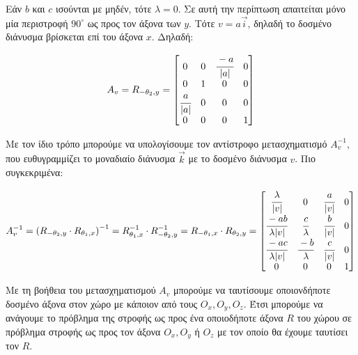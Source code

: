 \begin{solution}
\begin{remark}
	Εάν \(b\) και \(c\) ισούνται με μηδέν, τότε \(\lambda = 0\). Σε αυτή την περίπτωση απαιτείται μόνο μία περιστροφή \(90^\circ\) ως προς τον άξονα των \(y\). Τότε $v= a\vec{i}$, δηλαδή το δοσμένο διάνυσμα βρίσκεται επί του άξονα $x$. Δηλαδή:

	\[
		A_v = R_{-\theta_2, y} =
		\begin{bmatrix}
			0 & 0 & \cfrac{-a}{|a|} & 0 \\
			0 & 1 & 0 & 0 \\
			\cfrac{a}{|a|} & 0 & 0 & 0 \\
			0 & 0 & 0 & 1
		\end{bmatrix}
	\]
\end{remark}


\begin{remark}	
	Με τον ίδιο τρόπο μπορούμε να υπολογίσουμε τον αντίστροφο μετασχηματισμό \(A_v^{-1}\), που ευθυγραμμίζει το μοναδιαίο διάνυσμα \(\vec{k}\) με το δοσμένο διάνυσμα \(v\). Πιο συγκεκριμένα:
	
	\[
	A_v^{-1} 
		= \left(R_{-\theta_2, y} \cdot R_{\theta_1, x}\right)^{-1} 
		= R_{\theta_1, x}^{-1} \cdot R_{-\theta_2, y}^{-1}
		= R_{-\theta_1, x} \cdot R_{\theta_2, y} 
		= 	\begin{bmatrix}
				\cfrac{\lambda}{|v|} & 0 & \cfrac{a}{|v|} & 0 \\
				\cfrac{-ab}{\lambda |v|} & \cfrac{c}{\lambda} & \cfrac{b}{|v|} & 0 \\
				\cfrac{-ac}{\lambda|v|} & \cfrac{-b}{\lambda} & \cfrac{c}{|v|} & 0 \\
				0 & 0 & 0 & 1
			\end{bmatrix}
	\]
\end{remark}


\begin{remark}	
	Με τη βοήθεια του μετασχηματισμού \(A_v\) μπορούμε να ταυτίσουμε οποιονδήποτε δοσμένο άξονα στον χώρο με κάποιον από τους \(O_x, O_y, O_z\). Έτσι μπορούμε να ανάγουμε το πρόβλημα της στροφής ως προς ένα οποιοδήποτε άξονα \(R\) του χώρου σε πρόβλημα στροφής ως προς τον άξονα \(O_x, O_y\) ή \(O_z\) με τον οποίο θα έχουμε ταυτίσει τον \(R\).  
\end{remark}

	
\end{solution}